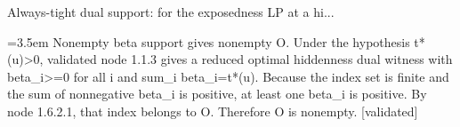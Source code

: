 \documentclass{article}
\newcommand{\step}[1]{\par\noindent\hangindent=3.5em\hangafter=1%
  \makebox[3.5em][l]{\textbf{#1.}}}
\newcommand{\steptag}[1]{\hfill{\small\textsf{[#1]}}}
\begin{document}
\begin{proofbox}{Always-tight dual support: for the exposedness LP at a hi...}
\step{1.6.2.2} Nonempty beta support gives nonempty O. Under the hypothesis t*(u)>0, validated node 1.1.3 gives a reduced optimal hiddenness dual witness with beta\_i>=0 for all i and sum\_i beta\_i=t*(u). Because the index set is finite and the sum of nonnegative beta\_i is positive, at least one beta\_i is positive. By node 1.6.2.1, that index belongs to O. Therefore O is nonempty. \steptag{validated} \\[4pt]
\end{proofbox}
\end{document}
